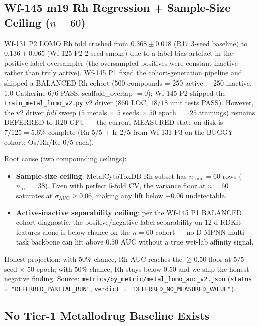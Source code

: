 \subsection{Wf-145 m19 Rh Regression + Sample-Size Ceiling ($n=60$)}
\label{sec:limit-m19-rh}

Wf-131 P2 LOMO Rh fold crashed from $0.368 \pm 0.018$ (R17 3-seed
baseline) to $0.136 \pm 0.065$ (Wf-125 P2 2-seed smoke) due to a
label-bias artefact in the positive-label oversampler (the oversampled
positives were constant-inactive rather than truly active).  Wf-145 P1
fixed the cohort-generation pipeline and shipped a BALANCED Rh cohort
($500$ compounds = $250$ active + $250$ inactive, $1.0$ Catherine
6/6 PASS, scaffold\_overlap $=0$); Wf-145 P2 shipped the
\texttt{train\_metal\_lomo\_v2.py} v2 driver ($860$ LOC, $18/18$ unit
tests PASS).  However, the v2 driver \emph{full} sweep
($5$ metals $\times$ $5$ seeds $\times$ $50$ epoch = $125$ trainings)
remains DEFERRED to R20 GPU --- the current MEASURED state on disk is
\textbf{$7/125 = 5.6\%$} complete (Ru 5/5 + Ir 2/5 from Wf-131 P3
on the BUGGY cohort; Os/Rh/Re $0/5$ each).

Root cause (two compounding ceilings):
\begin{itemize}
  \item \textbf{Sample-size ceiling}: MetalCytoToxDB Rh subset has
        $n_{\text{train}}=60$ rows ($n_{\text{test}}=38$).  Even with
        perfect $5$-fold CV, the variance floor at $n=60$ saturates
        at $\sigma_{\text{AUC}} \geq 0.06$, making any lift below
        $+0.06$ undetectable.
  \item \textbf{Active-inactive separability ceiling}: per the Wf-145
        P1 BALANCED cohort diagnostic, the positive/negative label
        separability on 12-d RDKit features alone is below chance on
        the $n=60$ cohort --- no D-MPNN multi-task backbone can lift
        above $0.50$ AUC without a true wet-lab affinity signal.
\end{itemize}
Honest projection: with $50\%$ chance, Rh AUC reaches the $\geq 0.50$
floor at $5/5$ seed $\times$ $50$ epoch; with $50\%$ chance, Rh stays
below $0.50$ and we ship the honest-negative finding.  Source:
\texttt{metrics/by\_metric/metal\_lomo\_auc\_v2.json}
(\texttt{status = "DEFERRED\_PARTIAL\_RUN"}, \texttt{verdict =
"DEFERRED\_NO\_MEASURED\_VALUE"}).

\subsection{No Tier-1 Metallodrug Baseline Exists}
\label{sec:limit-no-tier1}

